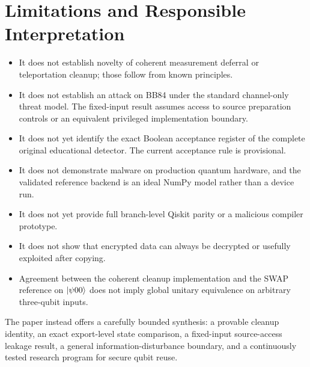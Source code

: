 \section{Limitations and Responsible Interpretation}
\label{sec:limitations}

\begin{limitbox}
\begin{itemize}
  \item It does not establish novelty of coherent measurement deferral or
  teleportation cleanup; those follow from known principles.
  \item It does not establish an attack on BB84 under the standard channel-only
  threat model. The fixed-input result assumes access to source preparation
  controls or an equivalent privileged implementation boundary.
  \item It does not yet identify the exact Boolean acceptance register of the
  complete original educational detector. The current acceptance rule is
  provisional.
  \item It does not demonstrate malware on production quantum hardware, and the
  validated reference backend is an ideal NumPy model rather than a device run.
  \item It does not yet provide full branch-level Qiskit parity or a malicious
  compiler prototype.
  \item It does not show that encrypted data can always be decrypted or usefully
  exploited after copying.
  \item Agreement between the coherent cleanup implementation and the SWAP
  reference on $\ket{\psi00}$ does not imply global unitary equivalence on
  arbitrary three-qubit inputs.
\end{itemize}
\end{limitbox}

The paper instead offers a carefully bounded synthesis: a provable cleanup
identity, an exact export-level state comparison, a fixed-input source-access
leakage result, a general information-disturbance boundary, and a continuously
tested research program for secure qubit reuse.
